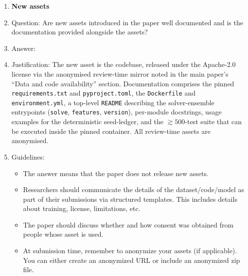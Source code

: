 \begin{enumerate}
\item {\bf New assets}
    \item[] Question: Are new assets introduced in the paper well documented and is the documentation provided alongside the assets?
    \item[] Answer: \answerYes{} %
    \item[] Justification: The new asset is the \ZornQ codebase,
        released under the Apache-2.0 license via the anonymised
        review-time mirror noted in the main paper's ``Data and code
        availability'' section. Documentation comprises the pinned
        \texttt{requirements.txt} and \texttt{pyproject.toml}, the
        \texttt{Dockerfile} and \texttt{environment.yml}, a top-level
        \texttt{README} describing the solver-ensemble entrypoints
        (\texttt{solve}, \texttt{features}, \texttt{version}), per-module
        docstrings, usage examples for the deterministic seed-ledger,
        and the ${\gtrsim}500$-test suite that can be executed inside
        the pinned container. All review-time assets are anonymised.
    \item[] Guidelines:
    \begin{itemize}
        \item The answer \answerNA{} means that the paper does not release new assets.
        \item Researchers should communicate the details of the dataset\slash code\slash model as part of their submissions via structured templates. This includes details about training, license, limitations, etc.
        \item The paper should discuss whether and how consent was obtained from people whose asset is used.
        \item At submission time, remember to anonymize your assets (if applicable). You can either create an anonymized URL or include an anonymized zip file.
    \end{itemize}


\end{enumerate}
